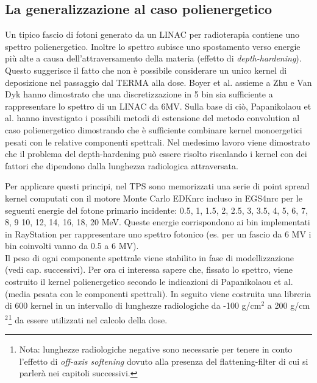 {\subsection{La generalizzazione al caso polienergetico}
Un tipico fascio di fotoni generato da un LINAC per radioterapia contiene uno spettro polienergetico. Inoltre lo spettro subisce uno spostamento verso energie più alte a causa dell'attraversamento della materia (effetto di \textit{depth-hardening}). Questo suggerisce il fatto che non è possibile considerare un unico kernel di deposizione nel passaggio dal TERMA alla dose. Boyer et al. assieme a Zhu e Van Dyk \cite{Boyer1989,Zhu1995} hanno dimostrato che una discretizzazione in 5 bin sia sufficiente a rappresentare lo spettro di un LINAC da 6MV. Sulla base di ciò, Papanikolaou et al. \cite{Papanikolaou1993} hanno investigato i possibili metodi di estensione del metodo convolution al caso polienergetico dimostrando che è sufficiente combinare kernel monoergetici pesati con le relative componenti spettrali. Nel medesimo lavoro viene dimostrato che il problema del depth-hardening può essere risolto riscalando i kernel con dei fattori che dipendono dalla lunghezza radiologica attraversata.

Per applicare questi principi, nel TPS sono memorizzati una serie di point spread kernel computati con il motore Monte Carlo EDKnrc incluso in EGS4nrc per le seguenti energie del fotone primario incidente: 0.5, 1, 1.5, 2, 2.5, 3, 3.5, 4, 5, 6, 7, 8, 9 10, 12, 14, 16, 18, 20 MeV. Queste energie corrispondono ai bin implementati in RayStation per rappresentare uno spettro fotonico (es. per un fascio da 6 MV i bin coinvolti vanno da 0.5 a 6 MV).\\
Il peso di ogni componente spettrale viene stabilito in fase di modellizzazione (vedi cap. successivi). Per ora ci interessa sapere che, fissato lo spettro, viene costruito il kernel polienergetico secondo le indicazioni di Papanikolaou et al. \cite{Papanikolaou1993} (media pesata con le componenti spettrali). In seguito viene costruita una libreria di 600 kernel in un intervallo di lunghezze radiologiche da -100 g/cm$^2$ a 200 g/cm$^2$\footnote{Nota: lunghezze radiologiche negative sono necessarie per tenere in conto l'effetto di \textit{off-axis softening} dovuto alla presenza del flattening-filter di cui si parlerà nei capitoli successivi.} da essere utilizzati nel calcolo della dose.


}
